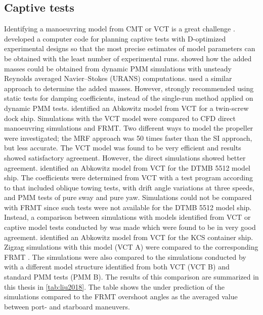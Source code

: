 \subsection{Captive tests} \label{sec:CT}
Identifying a manoeuvring model from CMT or VCT is a great challenge  \cite{sutuloAlgorithmOfflineIdentification2014}.
\textcite{sutuloSynthesisExperimentalDesigns2004} developed a computer code for planning captive tests with D-optimized experimental designs so that the most precise estimates of model parameters can be obtained with the least number of experimental runs.
\textcite{sakamotoURANSSimulationsStatic2012} showed how the added masses could be obtained from dynamic PMM simulations with unsteady Reynolds averaged Navier–Stokes (URANS) computations. \textcite{elmoctarRANSBasedSimulatedShip2014} used a similar approach to determine the added masses. 
However, \textcite{sakamotoURANSSimulationsStatic2012} strongly recommended using static tests for damping coefficients, instead of the single-run method applied on dynamic PMM tests.
\textcite{elmoctarRANSBasedSimulatedShip2014} identified an Abkowitz model from VCT for a twin-screw dock ship. Simulations with the VCT model were compared to CFD direct manoeuvring simulations and FRMT. Two different ways to model the propeller were investigated; the MRF approach was 50 times faster than the SI approach, but less accurate. The VCT model was found to be very efficient and results showed satisfactory agreement. However, the direct simulations showed better agreement.
\textcite{hajivandVirtualSimulationManoeuvring2015} identified an Abkowitz model from VCT for the DTMB 5512 model ship. The coefficients were determined from VCT with a test program according to \textcite{yoonBenchmarkCFDValidation2015c} that included oblique towing tests, with drift angle variations at three speeds, and PMM tests of pure sway and pure yaw.
Simulations could not be compared with FRMT since such tests were not available for the DTMB 5512 model ship. 
Instead, a comparison between simulations with models identified from VCT or captive model tests conducted by \textcite{yoonBenchmarkCFDValidation2015c} was made which were found to be in very good agreement.
\textcite{liuPredictionsShipManeuverability2018} identified an Abkowitz model from VCT for the KCS container ship. Zigzag simulations with this model (VCT A) were compared to the corresponding FRMT \cite{simmanWorkshopVerificationValidation2014}. The simulations were also compared to the simulations conducted by \textcite{simonsenKCSPMMTests2014} with a different model structure identified from both VCT (VCT B) and standard PMM tests (PMM B). The results of this comparison are summarized in this thesis in \autoref{tab:liu2018}. The table shows the under prediction of the simulations compared to the FRMT overshoot angles as the averaged value between port- and starboard maneuvers. 

